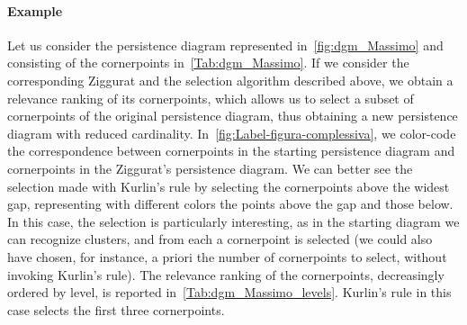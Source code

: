 \documentclass[english, LaM, oneside, noexaminfo]{sapthesis}
\begin{document}
\paragraph{Example}

\label{Example 2}

Let us consider the persistence diagram represented in~\cref{fig:dgm_Massimo} and consisting of the cornerpoints in~\cref{Tab:dgm_Massimo}. 
If we consider the corresponding Ziggurat and the selection algorithm described above, we obtain a relevance ranking of its cornerpoints, which allows us to select a subset of cornerpoints of the original persistence diagram, thus obtaining a new persistence diagram with reduced cardinality. In~\cref{fig:Label-figura-complessiva}, we color-code the correspondence between cornerpoints in the starting persistence diagram and cornerpoints in the Ziggurat's persistence diagram.
We can better see the selection made with Kurlin's rule by selecting the cornerpoints above the widest gap, representing with different colors the points above the gap and those below. In this case, the selection is particularly interesting, as in the starting diagram we can recognize clusters, and from each a cornerpoint is selected (we could also have chosen, for instance, a priori the number of cornerpoints to select, without invoking Kurlin's rule).
The relevance ranking of the cornerpoints,  decreasingly ordered by level, is reported in~\cref{Tab:dgm_Massimo_levels}. Kurlin's rule in this case selects the first three cornerpoints.
\end{document}
